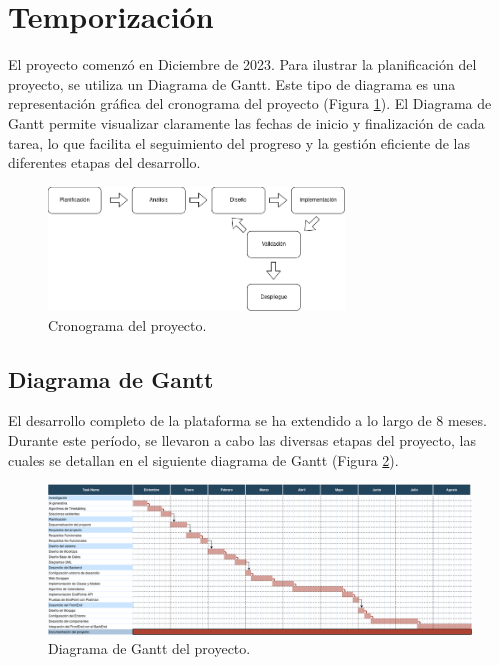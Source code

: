 \section{Temporización}

El proyecto comenzó en Diciembre de 2023. Para ilustrar la planificación del proyecto, se utiliza un Diagrama de Gantt. Este tipo de diagrama es una representación gráfica del cronograma del proyecto (Figura \ref{fig:cronograma}). El Diagrama de Gantt permite visualizar claramente las fechas de inicio y finalización de cada tarea, lo que facilita el seguimiento del progreso y la gestión eficiente de las diferentes etapas del desarrollo.

\begin{figure}[H]
    \centering
    \includegraphics[width=0.7\textwidth]{imagenes/cronograma.png}
    \caption{Cronograma del proyecto.}
    \label{fig:cronograma}
\end{figure}

\subsection{Diagrama de Gantt}

El desarrollo completo de la plataforma se ha extendido a lo largo de 8 meses. Durante este período, se llevaron a cabo las diversas etapas del proyecto, las cuales se detallan en el siguiente diagrama de Gantt (Figura \ref{fig:gantt}).

\begin{figure}[H]
    \centering
    \includegraphics[width=1\textwidth]{imagenes/gantt.png}
    \caption{Diagrama de Gantt del proyecto.}
    \label{fig:gantt}
\end{figure}


